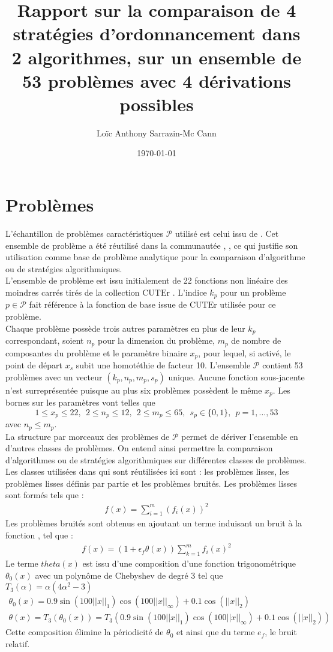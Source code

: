 \documentclass[letterpaper]{scrartcl}
\author{Loïc Anthony Sarrazin-Mc Cann}
\title{Rapport sur la comparaison de 4 stratégies d'ordonnancement dans 2 algorithmes, sur un ensemble de 53 problèmes avec 4 dérivations possibles}
\date{\today}
\newcommand{\Pset}{\mathcal{P}}
\begin{document}
\maketitle

\section{Problèmes}
L'échantillon de problèmes caractéristiques $\Pset$ utilisé est celui issu de \cite{MoWi2009}. Cet ensemble de problème a été réutilisé dans la communautée \cite{CoLed2011}, \cite{VaVi07}, ce qui justifie son utilisation comme base de problème analytique pour la comparaison d'algorithme ou de stratégies algorithmiques.\\
L'ensemble de problème est issu initialement de 22 fonctions non linéaire des moindres carrés tirés de la collection $\mathrm{CUTEr}$ \cite{GoOrTo03}. L'indice $k_p$ pour un problème $p \in \mathcal{P}$ fait référence à la fonction de base issue de $\mathrm{CUTEr}$ utilisée pour ce problème.\\
Chaque problème possède trois autres paramètres en plus de leur $k_p$ correspondant, soient $n_p$ pour la dimension du problème, $m_p$ de nombre de composantes du problème et le paramètre binaire $x_p$, pour lequel, si activé, le point de départ $x_s$ subit une homotéthie de facteur 10. L'ensemble $\Pset$ contient 53 problèmes avec un vecteur $ (k_p,n_p,m_p,s_p) $ unique. Aucune fonction sous-jacente n'est surreprésentée puisque au plus six problèmes possèdent le même $x_p$. Les bornes sur les paramètres vont telles que 
\begin{equation*}
1 \leq x_p \leq 22,\ \ 2 \leq n_p \leq 12,\ \ 2\leq m_p\leq 65,\ \ s_p \in \{0,1\},\ \ p=1,\dots,53
\end{equation*}
avec $n_p \leq m_p$.\\
La structure par morceaux des problèmes de $\Pset$ permet de dériver l'ensemble en d'autres classes de problèmes. On entend ainsi permettre la comparaison d'algorithmes ou de stratégies algorithmiques sur différentes classes de problèmes. Les classes utilisées dans \cite{MoWi2009} qui sont réutilisées ici sont : les problèmes lisses, les problèmes lisses définis par partie et les problèmes bruités. Les problèmes lisses sont formés tels que : 
\begin{gather*}
	f(x)=\sum_{i=1}^{m}{\left(f_i(x)\right)}^2
\end{gather*}
Les problèmes bruités sont obtenus en ajoutant un terme induisant un bruit à la fonction , tel que : 
\begin{gather*}
	f(x)=(1+\epsilon_{f}\theta(x))\sum_{k=1}^{m}{f_{i}(x)^{2}}
\end{gather*}
Le terme $theta(x)$ est issu d'une composition d'une fonction trigonométrique $\theta_0(x)$ avec un polynôme de Chebyshev de degré 3 tel que $T_{3}(\alpha) = \alpha(4\alpha^{2}-3)$
 \begin{gather*}
 	\theta_0(x)=0.9\sin(100||x||_{1})\cos(100||x||_\infty)+0.1\cos(||x||_2) \\
	\theta(x) = T_3(\theta_0(x)) = T_{3}(0.9\sin(100||x||_{1})\cos(100||x||_\infty)+0.1\cos(||x||_2))
\end{gather*} 
 Cette composition élimine la périodicité de $\theta_{0}$ et ainsi que du terme $e_f$, le bruit relatif.  
\end{document}
